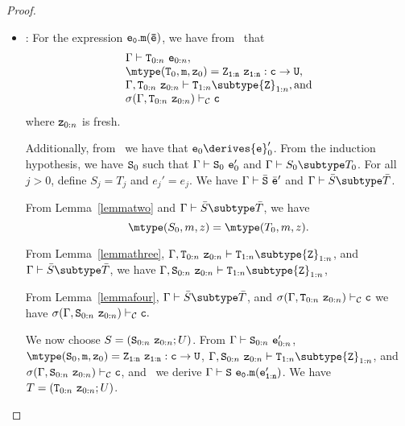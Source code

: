 \begin{proof}
\begin{itemize}
\begin{itemize}
   \item
   \RCInvkRecv: For the expression ${\tt e_0.m(\bar{e})}$,
            we have from \TInvk\ that
            $$
            \begin{array}{l}
            \Gamma \vdash {\tt T}_{0:n} \ {\tt e}_{0:n}, \\
            \mtype({\tt T}_0,{\tt m},{\tt z}_0) = 
               \tt {\tt Z}_{1:n}\ {\tt z}_{1:n}:c \rightarrow {\tt U}, \\
            \Gamma, {\tt T}_{0:n}\ {\tt z}_{0:n} \vdash 
                  {\tt T}_{1:n} \subtype {\tt Z}_{1:n}, \mbox{and} \\
            \sigma(\Gamma, {\tt T}_{0:n}\ {\tt z}_{0:n})
                  \vdash_{\cal C} {\tt c} \\
            \end{array}$$
            where ${\tt z}_{0:n}$ is fresh.

            Additionally, from \RCInvkRecv\ we have that
            ${\tt e}_0 \derives {{\tt e}}_0'$.
            From the induction hypothesis, we have ${\tt S}_0$ such that
            $\Gamma \vdash {\tt S}_0\ {{\tt e}}_0'$ and 
            $\Gamma \vdash S_0 \subtype T_0$.
            For all $j>0$, define $S_j = T_j$ and $e_j' = e_j$.
            We have 
            $\Gamma \vdash \bar{\tt S}\ \bar{\tt e}'$ and
            $\Gamma \vdash \bar{S} \subtype \bar{T}$.

            From Lemma~\ref{lemmatwo}
            and $\Gamma \vdash \bar{S} \subtype \bar{T}$, we have
            $$\mtype(S_0,m,z) = \mtype(T_0,m,z).$$

            From Lemma~\ref{lemmathree},
            $\Gamma, {\tt T}_{0:n}\ {\tt z}_{0:n} \vdash
                  {\tt T}_{1:n} \subtype {\tt Z}_{1:n}$,
            and $\Gamma \vdash \bar{S} \subtype \bar{T}$, we have
            $\Gamma, {\tt S}_{0:n}\ {\tt z}_{0:n} \vdash
                  {\tt T}_{1:n} \subtype {\tt Z}_{1:n}$,

            From Lemma~\ref{lemmafour}, 
            $\Gamma \vdash \bar{S} \subtype \bar{T}$, and
            $\sigma(\Gamma, {\tt T}_{0:n}\ {\tt z}_{0:n}) \vdash_{\cal C}
                              {\tt c}$
            we have
            $\sigma(\Gamma, {\tt S}_{0:n}\ {\tt z}_{0:n}) \vdash_{\cal C}
                              {\tt c}.$

            We now choose 
               $S=({\tt S}_{0:n}\ {\tt z}_{0:n}; U)$.
            From 
            $\Gamma \vdash {\tt S}_{0:n} \ {\tt e}_{0:n}'$,
            $\mtype({\tt S}_0,{\tt m},{\tt z}_0) =
               \tt {\tt Z}_{1:n}\ {\tt z}_{1:n}:c \rightarrow {\tt U}$,
            $\Gamma, {\tt S}_{0:n}\ {\tt z}_{0:n} \vdash
                  {\tt T}_{1:n} \subtype {\tt Z}_{1:n}$, and
            $\sigma(\Gamma, {\tt S}_{0:n}\ {\tt z}_{0:n}) \vdash_{\cal C}
                  {\tt c}$,
            and \TInvk\ we derive
            $\Gamma \vdash {\tt S}\ {\tt e_0.m(e_{1:n}')}$.
            We have 
               $T=({\tt T}_{0:n}\ {\tt z}_{0:n}; U)$.


\end{itemize}
\end{itemize}
\end{proof}
